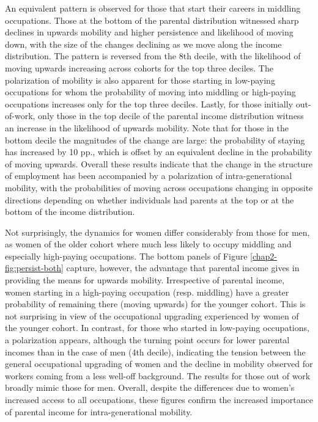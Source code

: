 An equivalent pattern is observed for those that start their careers in middling occupations. Those at the bottom of the parental distribution witnessed sharp declines in upwards mobility and higher persistence and likelihood of moving down, with the size of the changes declining as we move along the income distribution. The pattern is reversed from the 8th decile, with the likelihood of moving upwards increasing across cohorts for the top three deciles. The polarization of mobility is also apparent for those starting in low-paying occupations for whom the probability of moving into middling or high-paying occupations increases only for the top three deciles. Lastly, for those initially out-of-work, only those in the top decile of the parental income distribution witness an increase in the likelihood of upwards mobility. Note that for those in the bottom decile the magnitudes of the change are large: the probability of staying has increased by 10 pp., which is offset by an equivalent decline in the probability of moving upwards. Overall these results indicate that the change in the structure of employment has been accompanied by a polarization of intra-generational mobility, with the probabilities of moving across occupations changing in opposite directions depending on whether individuals had parents at the top or at the bottom of the income distribution.

Not surprisingly, the dynamics for women differ considerably from those for men, as women of the older cohort where much less likely to occupy middling and especially high-paying occupations. The bottom panels of Figure \ref{chap2-fig:persist-both} capture, however, the advantage that parental income gives in providing the means for upwards mobility. Irrespective of parental income, women starting in a high-paying occupation (resp. middling) have a greater probability of remaining there (moving upwards) for the younger cohort. This is not surprising in view of the occupational upgrading experienced by women of the younger cohort. In contrast, for those who started in low-paying occupations, a polarization appears, although the turning point occurs for lower parental incomes than in the case of men (4th decile), indicating the tension between the general occupational upgrading of women and the decline in mobility observed for workers coming from a less well-off background. The results for those out of work broadly mimic those for men. Overall, despite the differences due to women's increased access to all occupations, these figures confirm the increased importance of parental income for intra-generational mobility.

